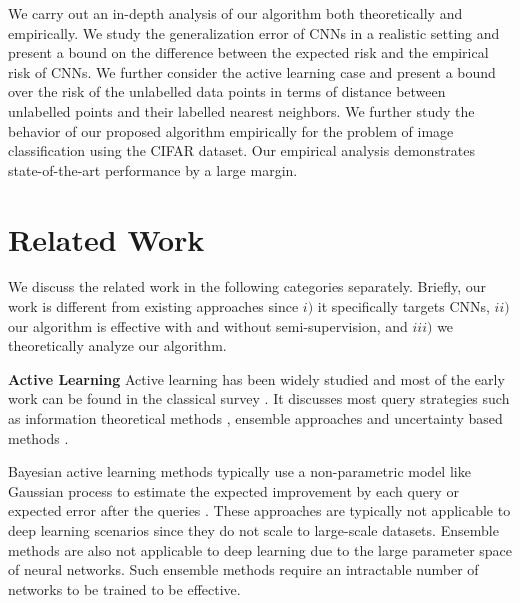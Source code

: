 \documentclass{article}
\begin{document}
We carry out an in-depth analysis of our algorithm both theoretically and empirically. We study the generalization error of CNNs in a realistic setting and present a bound on the difference between the expected risk and the empirical risk of CNNs. We further consider the active learning case and present a bound over the risk of the unlabelled data points in terms of distance between unlabelled points and their labelled nearest neighbors. We further study the behavior of our proposed algorithm empirically for the problem of image classification using the CIFAR\cite{cifar} dataset. Our empirical analysis demonstrates state-of-the-art performance by a large margin. 


\section{Related Work}
We discuss the related work in the following categories separately. Briefly, our work is different from existing approaches since $i)$ it specifically targets CNNs, $ii)$ our algorithm is effective with and without semi-supervision, and $iii)$ we theoretically analyze our algorithm.

\noindent\textbf{Active Learning}
Active learning has been widely studied and most of the early work can be found in the classical survey \cite{settles2010active}. It discusses most query strategies such as information theoretical methods \cite{mackay1992information}, ensemble approaches \cite{mccallumzy1998employing, freund1997selective} and uncertainty based methods \cite{tong2001support,lewissequential,joshi2009multi,li2013adaptive}. %

Bayesian active learning methods typically use a non-parametric model like Gaussian process to estimate the expected improvement by each query \cite{kapoor2007active} or expected error after the queries \cite{roy2001toward}. These approaches are typically not applicable to deep learning scenarios since they do not scale to large-scale datasets. Ensemble methods are also not applicable to deep learning due to the large parameter space of neural networks. Such ensemble methods require an intractable number of networks to be trained to be effective.
\end{document}
